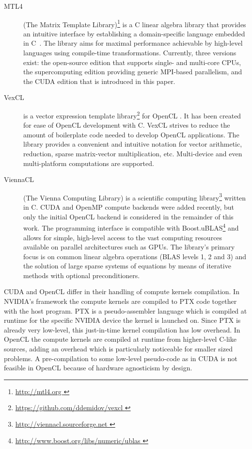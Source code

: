 \documentclass[final]{siamltex}
\newcommand{\addpp}[1]{{#1\nolinebreak[4]\hspace{-.05em}\raisebox{.4ex}{\tiny\bf ++}}\xspace}
\newcommand{\Cpp}{\addpp{C}}
\begin{document}
\begin{description}
    \item[MTL4] (The Matrix Template Library)\footnote{ \href{ http://mtl4.org }{
        http://mtl4.org }} is a \Cpp linear algebra library that provides
        an intuitive interface by establishing a domain-specific language
        embedded in \Cpp~\cite{pg_ccgrid12}.
        The library aims for maximal performance achievable by high-level languages
        using compile-time transformations.
        Currently, three versions exist: the open-source edition that supports
        single- and multi-core CPUs, the supercomputing edition providing
        generic MPI-based parallelism, and the CUDA edition that is introduced
        in this paper.
    \item[VexCL] is a vector expression template
        library\footnote{ \href{ https://github.com/ddemidov/vexcl }{
        https://github.com/ddemidov/vexcl }} for OpenCL \cite{VexCLRef}. It has
        been created for ease of OpenCL development with \Cpp.  VexCL strives to
        reduce the amount of boilerplate code needed to develop OpenCL
        applications. The library provides a convenient and intuitive notation
        for vector arithmetic, reduction, sparse matrix-vector multiplication,
        etc.  Multi-device and even multi-platform computations are supported.
    \item[ViennaCL] (The Vienna Computing Library) is a scientific computing
        library\footnote{ \href{ http://viennacl.sourceforge.net }{
        http://viennacl.sourceforge.net }} written in \Cpp \cite{ViennaCLRef}.
        CUDA and OpenMP compute backends were added recently, but
        only the initial OpenCL backend is considered in the remainder of this work.
        The programming interface is compatible with
        Boost.uBLAS\footnote{ \href{ http://www.boost.org/libs/numeric/ublas }
        { http://www.boost.org/libs/numeric/ublas } }
        and allows for simple, high-level access to the vast
        computing resources available on parallel architectures such as GPUs.
        The library's primary focus is on common linear algebra operations (BLAS
        levels 1, 2 and 3) and the solution of large sparse systems of equations by
        means of iterative methods with optional preconditioners.
\end{description}

CUDA and OpenCL differ in their handling of compute kernels compilation. In
NVIDIA's framework the compute kernels are compiled to PTX code together with
the host program. PTX is a pseudo-assembler language which is compiled at
runtime for the specific NVIDIA device the kernel is launched on. Since PTX is
already very low-level, this just-in-time kernel compilation has low overhead.
In OpenCL the compute kernels are compiled at runtime from higher-level C-like
sources, adding an overhead which is particularly noticeable for smaller
sized problems. A pre-compilation to some low-level pseudo-code as in CUDA is
not feasible in OpenCL because of hardware agnosticism by design.
\end{document}
